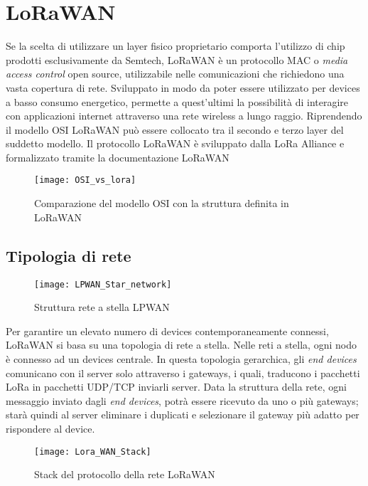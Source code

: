 \section{LoRaWAN}
Se la scelta di utilizzare un layer fisico proprietario comporta l'utilizzo di
chip prodotti esclusivamente da Semtech, 
LoRaWAN è un protocollo MAC o \emph{media access control} open source, utilizzabile nelle
comunicazioni che richiedono una vasta copertura di rete. Sviluppato in modo da
poter essere utilizzato per devices a basso consumo energetico, permette a
quest'ultimi la possibilità di interagire con applicazioni internet attraverso
una rete wireless a lungo raggio.
Riprendendo il modello OSI LoRaWAN può essere collocato tra il secondo e terzo
layer del suddetto modello.
Il protocollo LoRaWAN è sviluppato dalla LoRa Alliance e formalizzato tramite la
documentazione LoRaWAN 

\begin{figure}[h]
\centering 
\texttt{[image: OSI\_vs\_lora]}
\caption{Comparazione del modello OSI con la struttura definita in LoRaWAN}
\label{}
\end{figure}

\subsection{Tipologia di rete}
\begin{figure}[h]
\centering 
\texttt{[image: LPWAN\_Star\_network]}
\caption{Struttura rete a stella LPWAN}
\end{figure}
Per garantire un elevato numero di devices contemporaneamente connessi, LoRaWAN
si basa su una topologia di rete a stella.
Nelle reti a stella, ogni nodo è connesso ad un devices centrale.  
In questa topologia gerarchica, gli \emph{end devices} comunicano con il server
solo attraverso i gateways, i quali, traducono i pacchetti LoRa in pacchetti
UDP/TCP inviarli server.
Data la struttura della rete,  ogni messaggio inviato dagli \emph{end devices}, potrà essere ricevuto da uno o più
gateways; starà quindi al server eliminare i duplicati e selezionare il gateway
più adatto per rispondere al device.

\begin{figure}[h]
\centering 
\texttt{[image: Lora\_WAN\_Stack]}
\caption{Stack del protocollo della rete LoRaWAN}
\label{fig:stack_lora}
\end{figure}

